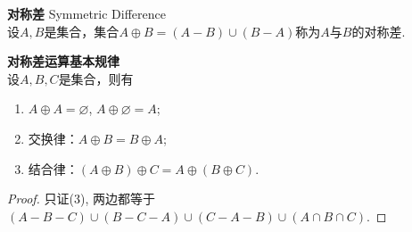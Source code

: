 \begin{dfn} \textbf{对称差} Symmetric Difference\\
设$A,B$是集合，集合$A\oplus B=(A-B)\cup (B-A)$称为$A$与$B$的对称差.
\end{dfn}

\begin{pro}\textbf{对称差运算基本规律}\\
设$A,B,C$是集合，则有
\begin{enumerate}
    \item $A\oplus A=\varnothing$, $A\oplus \varnothing=A$;
    \item 交换律：$A\oplus B=B\oplus A$;
    \item 结合律：$(A\oplus B)\oplus C=A\oplus (B\oplus C)$.
\end{enumerate}
\end{pro}
\begin{proof}
    只证(3), 两边都等于$(A-B-C)\cup (B-C-A)\cup(C-A-B)\cup(A\cap B\cap C)$.
\end{proof}

